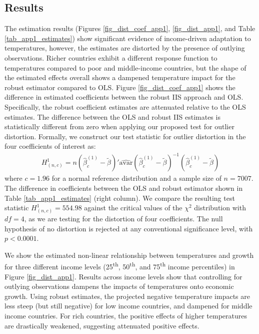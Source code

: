 \documentclass[11pt, letterpaper]{article}
\numberwithin{algorithm}{section}
\numberwithin{assumption}{section}
\numberwithin{lemma}{section}
\numberwithin{theorem}{section}
\numberwithin{corollary}{section}
\numberwithin{remark}{section}
\numberwithin{equation}{section}
\numberwithin{figure}{section}
\numberwithin{table}{section}
\newcommand{\ignore}[1]{}
\begin{document}
\subsection{Results}
The estimation results (Figures \ref{fig_dist_coef_app1}, \ref{fig_dist_app1}, and Table \ref{tab_app1_estimates}) show significant evidence of income-driven adaptation to temperatures, however, the estimates are  distorted by the presence of outlying observations. Richer countries exhibit a different response function to temperatures compared to poor and middle-income countries, but the shape of the estimated effects overall shows a dampened temperature impact for the robust estimator compared to OLS. Figure \ref{fig_dist_coef_app1} shows the difference in estimated coefficients between the robust IIS approach and OLS. Specifically, the robust coefficient estimates are attenuated relative to the OLS estimates. The difference between the OLS and robust IIS estimates is statistically different from zero when applying our proposed test for outlier distortion. Formally, we construct our test statistic for outlier distortion in the four coefficients of interest as:
\begin{eqnarray}
H^{1}_{(n,c)} = n \left( \hat{\beta}^{( 1)}_{c} - \tilde{\beta} \right)'\widehat{\mbox{avar}}\left( \hat{\beta}^{( 1)}_{c} - \tilde{\beta} \right)^{-1}\left( \hat{\beta}^{( 1)}_{c} - \tilde{\beta} \right)
\end{eqnarray}
where $c=1.96$\ignore{Check these numbers} for a normal reference distribution and a sample size of $n=7007$. The difference in coefficients between the OLS and robust estimator shown in Table \ref{tab_app1_estimates} (right column). We compare the resulting test statistic $H^{1}_{(n,c)} = 554.98$ against the critical values of the $\chi^{2}$ distribution with $df=4$, as we are testing for the distortion of four coefficients. The null hypothesis of no distortion is rejected at any conventional significance level, with $p<0.0001$.

We show the estimated non-linear relationship between temperatures and growth for three different income levels (25\textsuperscript{th}, 50\textsuperscript{th}, and 75\textsuperscript{th} income percentiles) in Figure \ref{fig_dist_app1}. Results across income levels show that controlling for outlying observations dampens the impacts of temperatures onto economic growth. Using robust estimates, the projected negative temperature impacts are less steep (but still negative) for low income countries, and dampened for middle income countries. For rich countries, the positive effects of higher temperatures are drastically weakened, suggesting attenuated positive effects.
\end{document}
